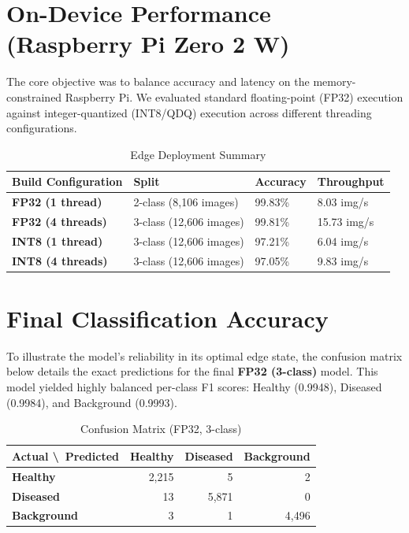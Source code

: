 \documentclass[a4paper,onesided,12pt]{report}
\begin{document}
\section{On-Device Performance (Raspberry Pi Zero 2 W)}

The core objective was to balance accuracy and latency on the memory-constrained Raspberry Pi. We evaluated standard floating-point (FP32) execution against integer-quantized (INT8/QDQ) execution across different threading configurations.

\begin{table}[h!]
\begin{center}
\caption{Edge Deployment Summary}
\begin{tabular}{|l|l|l|l|}
\hline
\textbf{Build Configuration} & \textbf{Split} & \textbf{Accuracy} & \textbf{Throughput} \\
\hline
\textbf{FP32 (1 thread)} & 2-class (8,106 images) & 99.83\% & 8.03 img/s \\
\hline
\textbf{FP32 (4 threads)} & 3-class (12,606 images) & 99.81\% & 15.73 img/s \\
\hline
\textbf{INT8 (1 thread)} & 3-class (12,606 images) & 97.21\% & 6.04 img/s \\
\hline
\textbf{INT8 (4 threads)} & 3-class (12,606 images) & 97.05\% & 9.83 img/s \\
\hline
\end{tabular}
\end{center}
\end{table}

\section{Final Classification Accuracy}

To illustrate the model's reliability in its optimal edge state, the confusion matrix below details the exact predictions for the final \textbf{FP32 (3-class)} model. This model yielded highly balanced per-class F1 scores: Healthy (0.9948), Diseased (0.9984), and Background (0.9993).

\begin{table}[h!]
\begin{center}
\caption{Confusion Matrix (FP32, 3-class)}
\begin{tabular}{|l|r|r|r|}
\hline
\textbf{Actual \textbackslash\ Predicted} & \textbf{Healthy} & \textbf{Diseased} & \textbf{Background} \\
\hline
\textbf{Healthy} & 2,215 & 5 & 2 \\
\hline
\textbf{Diseased} & 13 & 5,871 & 0 \\
\hline
\textbf{Background} & 3 & 1 & 4,496 \\
\hline
\end{tabular}
\end{center}
\end{table}
\end{document}
